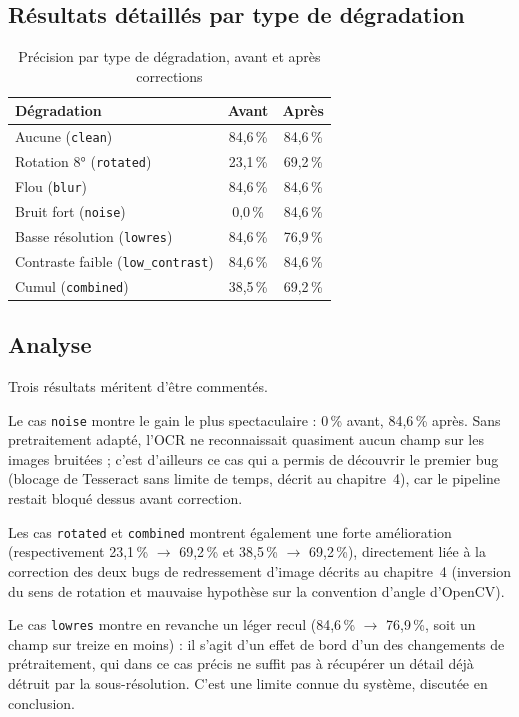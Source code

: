 \subsection{Résultats détaillés par type de dégradation}

\begin{table}[H]
\centering
\caption{Précision par type de dégradation, avant et après corrections}
\label{tab:resultats-degradation}
\begin{tabular}{lcc}
\toprule
Dégradation & Avant & Après \\
\midrule
Aucune (\texttt{clean}) & 84,6\,\% & 84,6\,\% \\
Rotation 8° (\texttt{rotated}) & 23,1\,\% & 69,2\,\% \\
Flou (\texttt{blur}) & 84,6\,\% & 84,6\,\% \\
Bruit fort (\texttt{noise}) & 0,0\,\% & 84,6\,\% \\
Basse résolution (\texttt{lowres}) & 84,6\,\% & 76,9\,\% \\
Contraste faible (\texttt{low\_contrast}) & 84,6\,\% & 84,6\,\% \\
Cumul (\texttt{combined}) & 38,5\,\% & 69,2\,\% \\
\bottomrule
\end{tabular}
\end{table}

\subsection{Analyse}

Trois résultats méritent d'être commentés.

Le cas \texttt{noise} montre le gain le plus spectaculaire : 0\,\% avant, 84,6\,\% après. Sans pretraitement adapté, l'OCR ne reconnaissait quasiment aucun champ sur les images bruitées ; c'est d'ailleurs ce cas qui a permis de découvrir le premier bug (blocage de Tesseract sans limite de temps, décrit au chapitre~4), car le pipeline restait bloqué dessus avant correction.

Les cas \texttt{rotated} et \texttt{combined} montrent également une forte amélioration (respectivement 23,1\,\% $\to$ 69,2\,\% et 38,5\,\% $\to$ 69,2\,\%), directement liée à la correction des deux bugs de redressement d'image décrits au chapitre~4 (inversion du sens de rotation et mauvaise hypothèse sur la convention d'angle d'OpenCV).

Le cas \texttt{lowres} montre en revanche un léger recul (84,6\,\% $\to$ 76,9\,\%, soit un champ sur treize en moins) : il s'agit d'un effet de bord d'un des changements de prétraitement, qui dans ce cas précis ne suffit pas à récupérer un détail déjà détruit par la sous-résolution. C'est une limite connue du système, discutée en conclusion.

